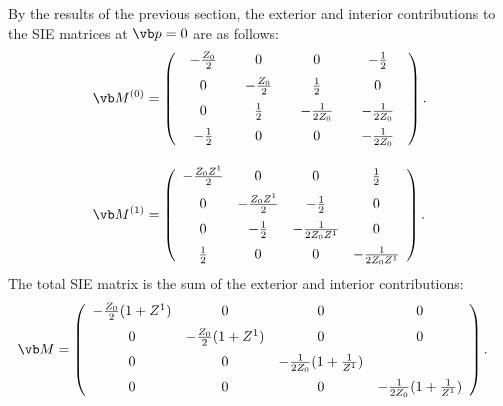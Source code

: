 \documentclass{article}
\begin{document}
By the results of the previous section, the exterior and
interior contributions to the SIE matrices at $\vb p=0$ 
are as follows:
\begin{align*}
 \vb M^{(0)}
&=\left(\begin{array}{cccc}
   \hspace{0.07in} -\frac{Z_0}{2}\hspace{0.07in}
  &
    0
  & 0 
  & -\frac{1}{2}
 \\[6pt]
    0
  &\hspace{0.07in} -\frac{Z_0}{2}\hspace{0.07in}
  & \frac{1}{2}
  & 0 
 \\[6pt]
    0
  &  \frac{1}{2}
  & \hspace{0.07in} -\frac{1}{2Z_0}\hspace{0.07in}
  & -\frac{1}{2Z_0}
 \\[6pt]
    -\frac{1}{2}
  & 0
  & 0
  & \hspace{0.07in} -\frac{1}{2Z_0}\hspace{0.07in}
   \end{array}\right).
\\[10pt]
\vb M^{(1)}
&=
   \left(\begin{array}{cccc}
    -\frac{Z_0Z^1}{2}
  &
    0
  & 0 
  & \frac{1}{2}
 \\[6pt]
    0
  & -\frac{Z_0Z^1}{2}
  & -\frac{1}{2}
  & 0 
 \\[6pt]
    0
  & -\frac{1}{2}
  & -\frac{1}{2Z_0Z^1}
  & 0
 \\[6pt]
    \frac{1}{2}
  & 0
  & 0
  & -\frac{1}{2Z_0Z^1}
   \end{array}\right).
\end{align*}
The total SIE matrix is the sum of the exterior and interior contributions:
\begin{align*}
 \vb M
&=
   \left(\begin{array}{cccc}
    -\frac{Z_0}{2}(1+Z^1)
  &
    0
  & 0 
  & 0
 \\[6pt]
    0
  & -\frac{Z_0}{2}(1+Z^1)
  & 0
  & 0 
 \\[6pt]
    0
  & 0
  & -\frac{1}{2Z_0}(1+\frac{1}{Z^1})
  &
 \\[6pt]
    0
  & 0
  & 0
  & -\frac{1}{2Z_0}(1+\frac{1}{Z^1})
   \end{array}\right).
\end{align*}
\end{document}
